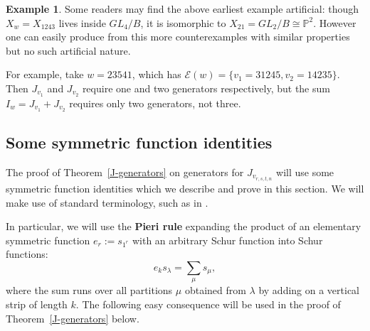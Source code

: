 \documentclass[12pt,dvips]{amsart}
\theoremstyle{plain}
\theoremstyle{definition}
\newtheorem{example}[theorem]{Example}
\theoremstyle{remark}
\numberwithin{equation}{section}
\def\Proj{{\mathbb P}}
\def\Ess{{\mathcal{E}}}
\begin{document}
\begin{example}
Some readers may find the above earliest example artificial: 
though $X_w=X_{1243}$ lives inside $GL_4/B$, it is isomorphic to
$X_{21}=GL_2/B \cong \Proj^2$. However one can easily produce from
this more counterexamples with similar properties but no such
artificial nature.

For example, take $w=23541$, which has $\Ess(w) = \{v_1 = 31245, v_2=14235\}$.
Then $J_{v_1}$ and $J_{v_2}$ require one and two generators respectively, 
but the sum $I_w=J_{v_1}+J_{v_2}$ requires only two generators, not three.
\end{example}




\subsection{Some symmetric function identities}

The proof of Theorem~\ref{J-generators} on generators for $J_{v_{r,s,t,n}}$ will
use some symmetric function identities which we describe and prove in this
section.  We will make use of standard terminology, such as in
\cite{Macdonald-symm-fns, Sagan, Stanley-EC2}.

In particular, we will use the {\bf Pieri rule} expanding 
the product of an elementary symmetric function $e_r:=s_{1^r}$ with an
arbitrary Schur function into Schur functions:
\begin{equation}
\label{Pieri-rule}
e_k s_\lambda = \sum_\mu s_\mu,
\end{equation}
where the sum runs over all partitions $\mu$ obtained from $\lambda$ by adding on
a vertical strip of length $k$.  The following easy consequence
will be used in the proof of Theorem~\ref{J-generators} below.
\end{document}
